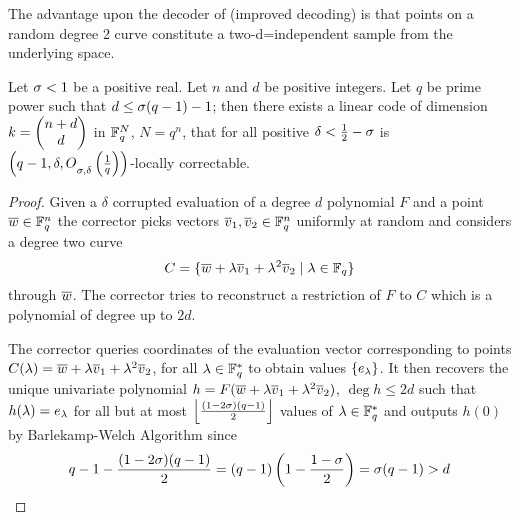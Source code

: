 The advantage upon the decoder of (improved decoding) is that points on a random degree 2 curve constitute a two-d=independent sample from the underlying space.
\begin{theorem}
	Let $\sigma<1$ be a positive real. Let $n$ and $d$ be positive integers. Let $q$ be prime power such that $d\leq \sigma(q-1)-1$; then there exists a linear code of dimension $k=\left(\begin{matrix} n+d\\ d \end{matrix}\right)$ in $\mathbb{F}_q^{N}$, $N=q^n$, that for all positive $\delta< \frac12-\sigma$ is $\left( q-1,\delta,O\strut_{\sigma,\delta}\left(\frac1q\right)\right)$-locally correctable.
\end{theorem}
\begin{proof}
	Given a $\delta$ corrupted evaluation of a degree $d$ polynomial $F$ and a point $\overline{w}\in \mathbb{F}_q^n$ the corrector picks vectors $\overline{v}_1,\overline{v}_2\in \mathbb{F}_q^n$ uniformly at random and considers a degree two curve $$C=\{\overline{w}+\lambda\overline{v}_1+\lambda^2\overline{v}_2\mid \lambda \in \mathbb{F}_q\}$$through $\overline{w}$. The corrector tries to reconstruct a restriction of $F$ to $C$ which is a polynomial of degree up to $2d$.
	
	The corrector queries coordinates of the evaluation vector corresponding to points $C(\lambda)=\overline{w}+\lambda\overline{v}_1+\lambda^2\overline{v}_2$, for all $\lambda\in \mathbb{F}_q^*$ to obtain values $\{e_{\lambda}\}$. It then  recovers the unique univariate polynomial $h=F(\overline{w}+\lambda\overline{v}_1+\lambda^2\overline{v}_2)$, $\deg h\leq 2d$ such that $h(\lambda)=e_{\lambda}$ for all but at most $\left\lfloor \frac{(1-2\sigma)(q-1)}2\right\rfloor$ values of $\lambda\in \mathbb{F}_q^*$ and outputs $h(0)$ by Barlekamp-Welch Algorithm since $$q-1-\frac{(1-2\sigma)(q-1)}2=(q-1)\left(1-\frac{1-\sigma}{2}\right)=\sigma(q-1)>d$$
	

\end{proof}
